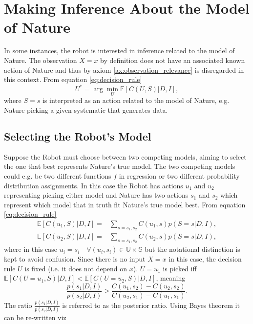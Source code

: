 \chapter{Making Inference About the Model of Nature}
In some instances, the robot is interested in inference related to the model of Nature. The observation $X=x$ by definition does not have an associated known action of Nature and thus by axiom \ref{ax:observation_relevance} is disregarded in this context. From equation \eqref{eq:decision_rule}
\begin{equation}
	U^*=\arg\min_U\mathbb{E}[C(U, S)|D,I],
	\label{eq:best_decision}
\end{equation}
where $S=s$ is interpreted as an action related to the model of Nature, e.g. Nature picking a given systematic that generates data.

\section{Selecting the Robot's Model}
\label{sec:model_selection}
Suppose the Robot must choose between two competing models, aiming to select the one that best represents Nature's true model. The two competing models could e.g. be two different functions $f$ in regression or two different probability distribution assignments. In this case the Robot has actions $u_1$ and $u_2$ representing picking either model and Nature has two actions $s_1$ and $s_2$ which represent which model that in truth fit Nature's true model best. From equation \eqref{eq:decision_rule}
\begin{equation}
	\begin{split}
		\mathbb{E}[C(u_1, S)|D,I] =&  \sum_{s = s_1,s_2}C(u_1,s)p(S=s|D,I),\\
		\mathbb{E}[C(u_2, S)|D,I] =&  \sum_{s = s_1,s_2}C(u_2,s)p(S=s|D,I),
	\end{split}
\end{equation}
where in this case $u_i=s_i\quad \forall (u_i,s_i)\in \mathbb{U}\times\mathbb{S}$ but the notational distinction is kept to avoid confusion. Since there is no input $X=x$ in this case, the decision rule $U$ is fixed (i.e. it does not depend on $x$). $U = u_1$ is picked iff $\mathbb{E}[C(U = u_1, S)|D,I]<\mathbb{E}[C(U = u_2, S)|D,I]$, meaning
\begin{equation}
	\frac{p(s_1|D,I)}{p(s_2|D,I)}>\frac{C(u_1,s_2)-C(u_2,s_2)}{C(u_2,s_1)-C(u_1,s_1)}.
\end{equation}
The ratio $\frac{p(s_1|D,I)}{p(s_2|D,I)}$ is referred to as the posterior ratio. Using Bayes theorem it can be re-written viz
